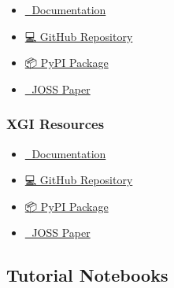 \documentclass[
  11pt,
  letterpaper,
  oneside,
  openany]{book}
\providecommand{\tightlist}{%
  \setlength{\itemsep}{0pt}\setlength{\parskip}{0pt}}
\begin{document}
\begin{itemize}
\tightlist
\item
  \href{https://brainets.github.io/frites/}{📖 Documentation}
\item
  \href{https://github.com/brainets/frites}{💻 GitHub Repository}
\item
  \href{https://pypi.org/project/frites/}{📦 PyPI Package}
\item
  \href{https://doi.org/10.21105/joss.03842}{📄 JOSS Paper}
\end{itemize}

\subsubsection*{XGI Resources}\label{xgi-resources}

\begin{itemize}
\tightlist
\item
  \href{https://xgi.readthedocs.io/}{📖 Documentation}
\item
  \href{https://github.com/xgi-org/xgi}{💻 GitHub Repository}
\item
  \href{https://pypi.org/project/xgi/}{📦 PyPI Package}
\item
  \href{https://doi.org/10.21105/joss.05162}{📄 JOSS Paper}
\end{itemize}

\subsection*{Tutorial Notebooks}\label{tutorial-notebooks}
\end{document}
